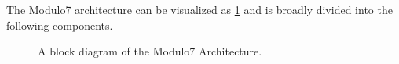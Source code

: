 \documentclass{article}
\begin{document}
The Modulo7 architecture can be visualized as \ref{fig:architecture} and is broadly divided into the following components. 

\begin{figure}[h]
\begin{center}
{}
 \caption{A block diagram of the Modulo7 Architecture.}
 \label{fig:architecture}
\end{center}
\end{figure}
\end{document}
